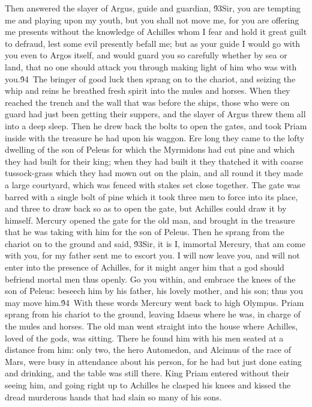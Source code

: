 {Then answered the slayer of Argus, guide and guardian, \'93Sir, you are tempting me and playing upon my youth, but you shall not move me, for you are offering me presents without the knowledge of Achilles whom I fear and hold it great guilt to defraud, lest some evil presently befall me; but as your guide I would go with you even to Argos itself, and would guard you so carefully whether by sea or land, that no one should attack you through making light of him who was with you.\'94\
The bringer of good luck then sprang on to the chariot, and seizing the whip and reins he breathed fresh spirit into the mules and horses. When they reached the trench and the wall that was before the ships, those who were on guard had just been getting their suppers, and the slayer of Argus threw them all into a deep sleep. Then he drew back the bolts to open the gates, and took Priam inside with the treasure he had upon his waggon. Ere long they came to the lofty dwelling of the son of Peleus for which the Myrmidons had cut pine and which they had built for their king; when they had built it they thatched it with coarse tussock-grass which they had mown out on the plain, and all round it they made a large courtyard, which was fenced with stakes set close together. The gate was barred with a single bolt of pine which it took three men to force into its place, and three to draw back so as to open the gate, but Achilles could draw it by himself. Mercury opened the gate for the old man, and brought in the treasure that he was taking with him for the son of Peleus. Then he sprang from the chariot on to the ground and said, \'93Sir, it is I, immortal Mercury, that am come with you, for my father sent me to escort you. I will now leave you, and will not enter into the presence of Achilles, for it might anger him that a god should befriend mortal men thus openly. Go you within, and embrace the knees of the son of Peleus: beseech him by his father, his lovely mother, and his son; thus you may move him.\'94\
With these words Mercury went back to high Olympus. Priam sprang from his chariot to the ground, leaving Idaeus where he was, in charge of the mules and horses. The old man went straight into the house where Achilles, loved of the gods, was sitting. There he found him with his men seated at a distance from him: only two, the hero Automedon, and Alcimus of the race of Mars, were busy in attendance about his person, for he had but just done eating and drinking, and the table was still there. King Priam entered without their seeing him, and going right up to Achilles he clasped his knees and kissed the dread murderous hands that had slain so many of his sons.\
}
